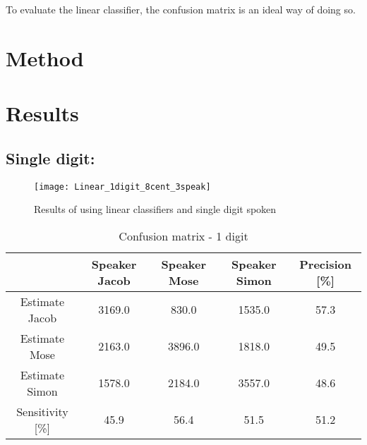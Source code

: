To evaluate the linear classifier, the confusion matrix is an ideal way of doing so.



\section{Method}


\section{Results}
\subsection{Single digit:}

\begin{figure}[H]
\centering
\texttt{[image: Linear\_1digit\_8cent\_3speak]}
\caption{Results of using linear classifiers and single digit spoken}
\label{fig:Lin_fig_1}
\end{figure}

\begin{table}[H]                                                    
\centering                                                          
\begin{tabular}{|c|c|c|c|c|}                                        
\hline                                                              
  & Speaker Jacob & Speaker Mose & Speaker Simon & Precision [\%] \\
\hline                                                              
Estimate Jacob & 3169.0 & 830.0 & 1535.0 & 57.3 \\                  
\hline                                                              
Estimate Mose & 2163.0 & 3896.0 & 1818.0 & 49.5 \\                  
\hline                                                              
Estimate Simon & 1578.0 & 2184.0 & 3557.0 & 48.6 \\                 
\hline                                                              
Sensitivity [\%] & 45.9 & 56.4 & 51.5 & 51.2 \\                     
\hline                                                              
\end{tabular}                                                       
\caption{Confusion matrix - 1 digit}                                
\label{table:Lin_conf_1}                                            
\end{table}     
                   

